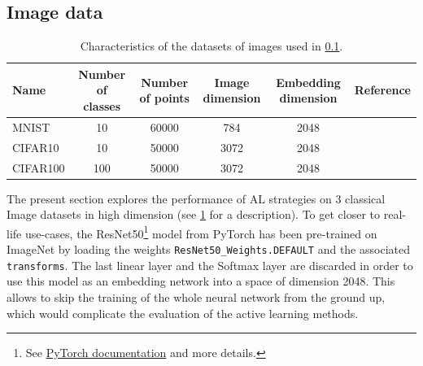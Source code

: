 \documentclass[twoside]{article}
\theoremstyle{definition}
\theoremstyle{remark}
\begin{document}
\subsection{Image data}
\label{sub:image_data}

%
\begin{table}[h]
    \centering
        \caption{Characteristics of the datasets of images used in \cref{sub:image_data}.}
    \label{tab:char_image_datasets}
    \begin{tabular}{lccccr}
    \toprule
          Name & Number of classes & Number of points & Image dimension & Embedding dimension & Reference\\
    \midrule
          MNIST      & 10 & 60000 & 784 & 2048 & \citep{lecun1998mnist}\\
          CIFAR10    & 10 & 50000 & 3072 & 2048 & \citep{krizhevskyLearningMultipleLayers2009}\\
          CIFAR100 & 100 & 50000 & 3072  & 2048 & \citep{krizhevskyLearningMultipleLayers2009}\\
    \bottomrule
    \end{tabular}
\end{table}
%
The present section explores the performance of AL strategies on 3 classical Image datasets in high dimension (see \cref{tab:char_image_datasets} for a description). 
%
To get closer to real-life use-cases, the ResNet50\footnote{See \href{https://docs.pytorch.org/vision/main/models/generated/torchvision.models.resnet50.html\#torchvision.models.resnet50}{PyTorch documentation} and \citep{heDeepResidualLearning2015} more details.} model from PyTorch \citep{anselPyTorch2Faster2024} has been pre-trained on ImageNet \citep{dengImagenetLargescaleHierarchical2009} by loading the weights \texttt{ResNet50\_Weights.DEFAULT} and the associated \texttt{transforms}.
%
The last linear layer and the Softmax layer are discarded in order to use this model as an embedding network into a space of dimension 2048.
%
This allows to skip the training of the whole neural network from the ground up, which would complicate the evaluation of the active learning methods.
\end{document}
